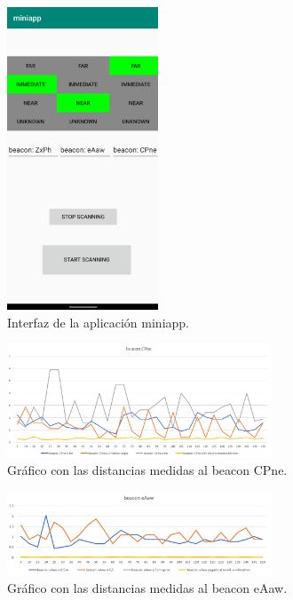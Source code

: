 \begin{figure}[t]
	\centering
	\includegraphics[width=0.4\textwidth]{Imagenes/Descripciondeltrabajo/miniapp}
	\caption{Interfaz de la aplicación miniapp. }
	\label{fig:miniapp}
\end{figure}


\begin{figure}[t]
	\centering
	\includegraphics[width=0.7\textwidth]{Imagenes/Descripciondeltrabajo/dist_CPne}
	\caption{Gráfico con las distancias medidas al beacon CPne. }
	\label{fig:dist_CPne}
\end{figure}


\begin{figure}[t]
	\centering
	\includegraphics[width=0.7\textwidth]{Imagenes/Descripciondeltrabajo/dist_eAaw}
	\caption{Gráfico con las distancias medidas al beacon eAaw. }
	\label{fig:dist_eAaw}
\end{figure}


